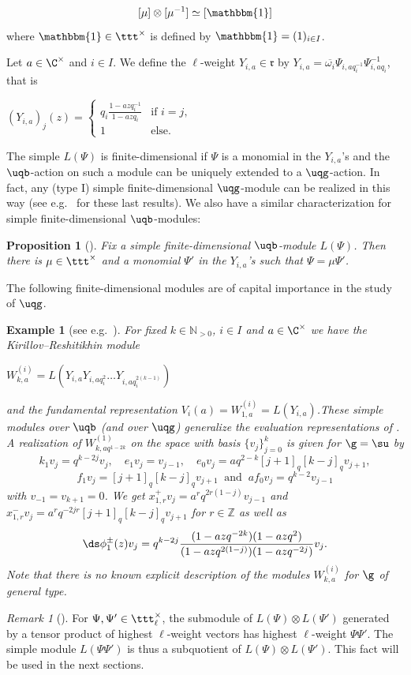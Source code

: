 \documentclass[11pt]{amsart}
\newtheorem{prop}[theorem]{Proposition}
\newtheorem{example}[theorem]{Example}
\theoremstyle{definition}
\theoremstyle{remark}
\newtheorem{rem}[theorem]{Remark}
\numberwithin{equation}{section}
\begin{document}
$$ [\mu] \otimes [\mu^{-1}] \simeq [\mathbbm{1}]$$
where $\mathbbm{1}\in \ttt^{\times}$ is defined by $\mathbbm{1}=(1)_{i\in I}$.\par  
Let $a\in \C^{\times}$ and $i \in I$. We define the $\ell$-weight $Y_{i,a}\in \mathfrak{r}$ by $Y_{i,a} = \overline{\omega_i}\Psi_{i,a q_i^{-1}}\Psi_{i,aq_i}^{-1}$, that is 
\begin{center}
$(Y_{i,a})_j(z) = \left\{\begin{array}{ll}
q_i \frac{1-azq_i^{-1}}{1-azq_i} & \text{if } i=j,\\
1 & \text{else}.
\end{array}\right.$
\end{center}
The simple $L(\Psi)$ is finite-dimensional if $\Psi$ is a monomial in the $Y_{i,a}$'s and the $\uqb$-action on such a module can be uniquely extended to a $\uqg$-action. In fact, any (type I) simple finite-dimensional $\uqg$-module can be realized in this way (see e.g.~\cite{her,cp1,cp2} for these last results). We also have a similar characterization for simple finite-dimensional $\uqb$-modules:
\begin{prop}[{\cite[Remark 3.11]{fh1}}]\label{prop:CharacSimFD} Fix a simple finite-dimensional $\uqb$-module $L(\Psi)$. Then there is $\mu \in \ttt^{\times}$ and a monomial $\Psi'$ in the $Y_{i,a}$'s such that $\Psi=\mu\Psi'$.
\end{prop}
The following finite-dimensional modules are of capital importance in the study of $\uqg$.
\begin{example}[see e.g.~{\cite[Example 3.12]{fh1}}]\label{ex:KRsl2} For fixed $k\in \mathbb{N}_{>0}$, $i \in I$ and $a \in \C^{\times}$ we have the Kirillov--Reshitikhin module  
\begin{center}
$W_{k,a}^{(i)} = L(Y_{i,a}Y_{i,aq_i^2}\dots Y_{i,aq_i^{2(k-1)}})$
\end{center}\vspace*{-1mm}
and the fundamental representation $V_i(a) = W_{1,a}^{(i)} = L(Y_{i,a})$.\newpage These simple modules over $\uqb$ (and over $\uqg$) generalize the evaluation representations of \cite{cp1}. A realization of $W_{k,aq^{1-2k}}^{(1)}$ on the space with basis $\{v_j\}_{j=0}^k$ is given for $\g = \su$ by
$$k_1v_j = q^{k-2j}v_j, \quad e_1v_j = v_{j-1}, \quad e_0v_j = aq^{2-k}[j+1]_q[k-j]_qv_{j+1},$$
$$f_1v_j = [j+1]_q[k-j]_qv_{j+1} \ \text{  and }\  af_0v_j =q^{k-2}v_{j-1}$$
with $v_{-1} = v_{k+1} = 0$. We get $x_{1,r}^+v_j = a^rq^{2r(1-j)}v_{j-1}$ and $x_{1,r}^-v_j = a^rq^{-2jr}[j+1]_q[k-j]_qv_{j+1}$ for $r\in \mathbb{Z}$ as well as
$$\ds \phi_{1}^{\pm}(z)v_j= q^{k-2j}\frac{(1-azq^{-2k})(1-azq^2)}{(1-azq^{2(1-j)})(1-azq^{-2j})}v_j.$$
Note that there is no known explicit description of the modules $W_{k,a}^{(i)}$ for $\g$ of general type.
\end{example}
\begin{rem}[{\cite[Remark 3.6]{hj}}]\label{rem:L(PP')} For $\Psi,\Psi'\in \ttt^{\times}_{\ell}$, the submodule of $L(\Psi)\otimes L(\Psi')$ generated by a tensor product of highest $\ell$-weight vectors has highest $\ell$-weight $\Psi\Psi'$. The simple module $L(\Psi\Psi')$ is thus a subquotient of $L(\Psi)\otimes L(\Psi')$. This fact will be used in the next sections.
\end{rem}
\end{document}
